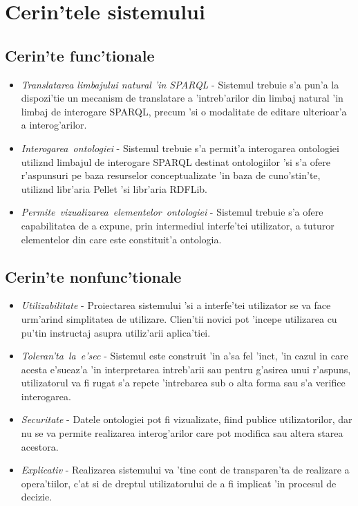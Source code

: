\documentclass[12pt,a4paper,twoside]{report}
\begin{document}
\section{Cerin'tele sistemului}

\subsection{Cerin'te func'tionale}

\begin{itemize}
    \item {\it Translatarea limbajului natural 'in SPARQL} - Sistemul trebuie s'a pun'a la dispozi'tie un mecanism de translatare a 'intreb'arilor din limbaj natural 'in limbaj de interogare SPARQL, precum 'si o modalitate de editare ulterioar'a a interog'arilor.
    \item {\it Interogarea\ ontologiei} -  Sistemul trebuie s'a permit'a interogarea ontologiei utiliz\ia nd limbajul de interogare SPARQL destinat ontologiilor 'si s'a ofere r'aspunsuri pe baza resurselor conceptualizate 'in baza de cuno'stin'te, utiliz\ia nd libr'aria Pellet 'si libr'aria RDFLib.
    \item {\it Permite\ vizualizarea\ elementelor\ ontologiei} - Sistemul trebuie s'a ofere capabilitatea de a expune, prin intermediul interfe'tei utilizator, a tuturor elementelor din care este constituit'a ontologia.
\end{itemize}
\subsection{Cerin'te nonfunc'tionale}
\begin{itemize}
    \item {\it Utilizabilitate} - Proiectarea sistemului 'si a interfe'tei utilizator se va face urm'arind simplitatea de utilizare. Clien'tii novici pot 'incepe utilizarea cu pu'tin instructaj asupra utiliz'arii aplica'tiei.
    \item {\it Toleran'ta\ la\ e'sec} - Sistemul este construit 'in a'sa fel 'inc\ia t, 'in cazul in care acesta e'sueaz'a 'in interpretarea intreb'arii sau pentru g'asirea unui r'aspuns, utilizatorul va fi rugat s'a repete 'intrebarea sub o alta forma sau s'a verifice interogarea.
    \item {\it Securitate} - Datele ontologiei pot fi vizualizate, fiind publice utilizatorilor, dar nu se va permite realizarea interog'arilor care pot modifica  sau altera starea acestora.
    \item {\it Explicativ} - Realizarea sistemului va 'tine cont de transparen'ta de realizare a opera'tiilor, c'at si de dreptul utilizatorului de a fi implicat 'in procesul de decizie.
\end{itemize}
\end{document}
